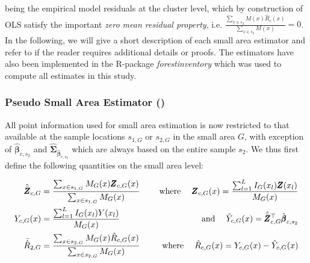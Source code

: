 \noindent being the empirical model residuals at the cluster level, which by construction of OLS satisfy the important \textit{zero mean residual property}, i.e. $\frac{\sum_{x \in s_{2}} M(x) \hat{R}_{c}(x)}{\sum_{x \in s_{2}} M(x)}=0$.\\

In the following, we will give a short description of each small area estimator and refer to \citet{mandallaz2013a, mandallaz2016, mandallaz2013b} if the reader requires additional details or proofs. The estimators have also been implemented in the R-package \textit{forestinventory} \citep{forestinventory} which was used to compute all estimates in this study.\\



\subsubsection{Pseudo Small Area Estimator (\psmall{})}
\label{sec:psmall}

All point information used for small area estimation is now restricted to that available at the sample locations $s_{1,G}$ or $s_{2,G}$ in the small area $G$, with exception of $\hat{\pmb{\beta}}_{c,s_2}$ and $\hat{\pmb{\Sigma}}_{\hat{\pmb{\beta}}_{c,s_2}}$ which are always based on the entire sample $s_2$. We thus first define the following quantities on the small area level:

\begin{subequations}\label{eq:compsG}
	\begin{align}
	\hat{\bar{\pmb{Z}}}_{c,G} &= \frac{\sum_{x \in s_{1,G}} M_{G}(x) \pmb{Z}_{c,G}(x)}{\sum_{x \in s_{1,G}} M_{G}(x)} \label{eq:meanZcG} \hspace{3ex} &\text{where} \hspace{3ex}
	\pmb{Z}_{c,G}(x) =  \frac{\sum_{l=1}^{L} I_{G}(x_l)\pmb{Z}(x_l)}{M_{G}(x)}\\		
	Y_{c,G}(x) &= \frac{\sum_{l=1}^{L} I_{G}(x_l)Y(x_l)}{M_{G}(x)}  &\text{and} \hspace{3ex}
	\hat{Y}_{c,G}(x)=\hat{\bar{\pmb{Z}}}_{c,G}^{\top}\hat{\pmb{\beta}}_{c,s_2}\\
	\bar{\hat{R}}_{2,G} &= \frac{\sum_{x \in s_{2,G}} M_{G}(x) \hat{R}_{c,G}(x)}{\sum_{x \in s_{2,G}} M_{G}(x)} \hspace{3ex} &\text{where} \hspace{3ex}
	\hat{R}_{c,G}(x) = Y_{c,G}(x)-\hat{Y}_{c,G}(x)
	\end{align}
\end{subequations}

